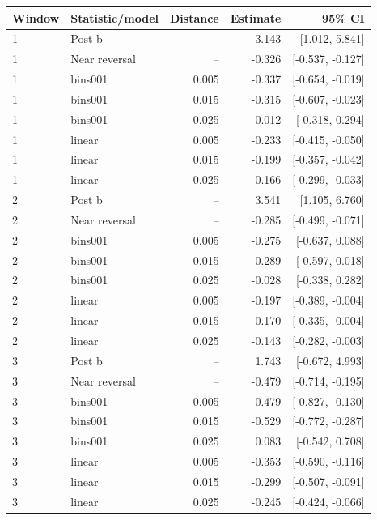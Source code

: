 \begin{threeparttable}
\begin{tabular}{llrrr}
\toprule
Window & Statistic/model & Distance & Estimate & 95\% CI \\
\midrule
1 & Post b & -- & 3.143 & [1.012, 5.841] \\
1 & Near reversal & -- & -0.326 & [-0.537, -0.127] \\
1 & bins001 & 0.005 & -0.337 & [-0.654, -0.019] \\
1 & bins001 & 0.015 & -0.315 & [-0.607, -0.023] \\
1 & bins001 & 0.025 & -0.012 & [-0.318, 0.294] \\
1 & linear & 0.005 & -0.233 & [-0.415, -0.050] \\
1 & linear & 0.015 & -0.199 & [-0.357, -0.042] \\
1 & linear & 0.025 & -0.166 & [-0.299, -0.033] \\
2 & Post b & -- & 3.541 & [1.105, 6.760] \\
2 & Near reversal & -- & -0.285 & [-0.499, -0.071] \\
2 & bins001 & 0.005 & -0.275 & [-0.637, 0.088] \\
2 & bins001 & 0.015 & -0.289 & [-0.597, 0.018] \\
2 & bins001 & 0.025 & -0.028 & [-0.338, 0.282] \\
2 & linear & 0.005 & -0.197 & [-0.389, -0.004] \\
2 & linear & 0.015 & -0.170 & [-0.335, -0.004] \\
2 & linear & 0.025 & -0.143 & [-0.282, -0.003] \\
3 & Post b & -- & 1.743 & [-0.672, 4.993] \\
3 & Near reversal & -- & -0.479 & [-0.714, -0.195] \\
3 & bins001 & 0.005 & -0.479 & [-0.827, -0.130] \\
3 & bins001 & 0.015 & -0.529 & [-0.772, -0.287] \\
3 & bins001 & 0.025 & 0.083 & [-0.542, 0.708] \\
3 & linear & 0.005 & -0.353 & [-0.590, -0.116] \\
3 & linear & 0.015 & -0.299 & [-0.507, -0.091] \\
3 & linear & 0.025 & -0.245 & [-0.424, -0.066] \\
\bottomrule
\end{tabular}
\begin{tablenotes}[flushleft]
\footnotesize

\end{tablenotes}
\end{threeparttable}
